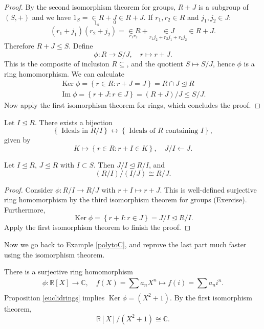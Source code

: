 \documentclass[egregdoesnotlikesansseriftitles,a4paper]{scrartcl}
\begin{document}
\begin{proof}
       By the second isomorphism theorem for groups, $R+J$ is a subgroup of $\left(S,+\right)$ and we have $1_{S}=\underset{1_{S}}{\in R} +\underset{0}{J} \in R+J $. If $r_1 ,r_2 \in R$ and $j_1 ,j_2 \in J$: \[
       \left(r_1 +j_1 \right)\left(r_2 +j_2 \right)=\underset{r_1 r_2 }{\in R}+ \underset{r_1 j_2 +r_2 j_1 +r_2 j_2  }{\in J}\in R+J
       .\] Therefore $R+J \leq S $. Define \[
       \phi : R \rightarrow S/J, \quad r \mapsto r+J
       .\] This is the composite of inclusion $R \subseteq$, and the quotient $S \mapsto S/J$, hence $\phi $ is a ring homomorphism. We can calculate 
       \begin{align*}
             \operatorname{Ker}\phi =\left\{r \in R: r+J=J\right\}=R \cap J \unlhd R\\
             \operatorname{Im}\phi =\left\{r+J: r \in J\right\} = \left(R+J\right)/J \leq  S/J.
       \end{align*}
       Now apply the first isomorphism theorem for rings, which concludes the proof.
\end{proof}
\begin{remark}
       Let $I \unlhd R$. There exists a bijection \[
       \left\{\text{ Ideals in } R/I\right\} \leftrightarrow \left\{\text{ Ideals of } R \text{ containing } I\right\}
       ,\] given by \[
       K \mapsto \left\{r \in R: r+I \in K\right\}, \quad J/I \leftarrow J
       .\] 
\end{remark}
\begin{theorem}
       Let $I \unlhd R$, $J \unlhd R$ with $I \subset S$. Then $J/I \unlhd R/I$, and \[
       \left(R/I\right)/\left(I/J\right) \cong R/J
       .\]
\end{theorem}
\begin{proof}
       Consider $\phi : R/I \rightarrow R/J$ with $r+I \mapsto r+J$. This is well-defined surjective ring homomorphism by the third isomorphism theorem for groups (Exercise). Furthermore, \[
       \operatorname{Ker}\phi =\left\{r+I: r \in J\right\}=J/I \unlhd R/I
       .\] Apply the first isomorphism theorem to finish the proof.
\end{proof}
Now we go back to Example \ref{polytoC}, and reprove the last part much faster using the isomorphism theorem.
\begin{example*}
       There is a surjective ring homomorphism \[
       \phi : \mathbb{R}[X] \rightarrow \mathbb{C},\quad f \left(X\right)=\sum_{}^{}a_{n}X^{n} \mapsto f \left(i\right)=\sum_{}^{}a_{n}i^{n}
       .\] Proposition \ref{euclidrings} implies $\operatorname{Ker}\phi =\left(X^2+1\right)$. By the first isomorphism theorem, \[
       \mathbb{R}[X]/\left(X^2+1\right)\cong \mathbb{C}
       .\] 
\end{example*}
\end{document}
